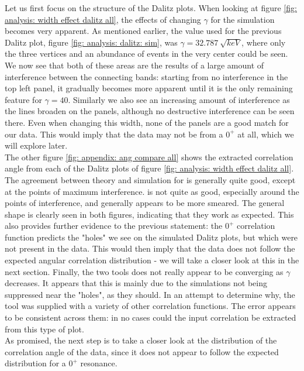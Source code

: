 Let us first focus on the structure of the Dalitz plots. When looking at figure \ref{fig: analysis: width effect dalitz all}, the effects of changing $\gamma$ for the \simta{} simulation becomes very apparent. As mentioned earlier, the value used for the previous Dalitz plot, figure \ref{fig: analysis: dalitz: sim}, was $\gamma = \SI{32.787}{\sqrt{keV}}$, where only the three vertices and an abundance of events in the very center could be seen. We now see that both of these areas are the results of a large amount of interference between the connecting bands: starting from no interference in the top left panel, it gradually becomes more apparent until it is the only remaining feature for $\gamma = 40$. Similarly we also see an increasing amount of interference as the lines broaden on the \simX{} panels, although no destructive interference can be seen there. Even when changing this width, none of the panels are a good match for our data. This would imply that the data may not be from a $0^+$ at all, which we will explore later. \\

The other figure \ref{fig: appendix: ang compare all} shows the extracted correlation angle from each of the Dalitz plots of figure \ref{fig: analysis: width effect dalitz all}. The agreement between theory and simulation for \simta{} is generally quite good, except at the points of maximum interference. \simX{} is not quite as good, especially around the points of interference, and generally appears to be more smeared. The general shape is clearly seen in both figures, indicating that they work as expected. This also provides further evidence to the previous statement: the $0^+$ correlation function predicts the "holes" we see on the simulated \simta{} Dalitz plots, but which were not present in the data. This would then imply that the data does not follow the expected angular correlation distribution - we will take a closer look at this in the next section. Finally, the two tools does not really appear to be converging as $\gamma$ decreases. It appears that this is mainly due to the \simX{} simulations not being suppressed near the "holes", as they should. In an attempt to determine why, the tool was supplied with a variety of other correlation functions. The error appears to be consistent across them: in no cases could the input correlation be extracted from this type of plot. \\

As promised, the next step is to take a closer look at the distribution of the correlation angle of the data, since it does not appear to follow the expected distribution for a $0^+$ resonance. 

